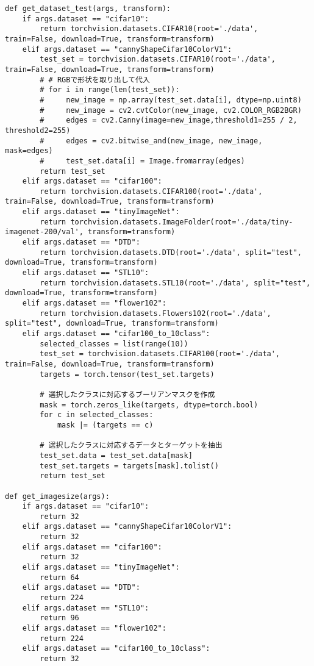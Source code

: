 {\begin{verbatim}
def get_dataset_test(args, transform):
    if args.dataset == "cifar10":
        return torchvision.datasets.CIFAR10(root='./data', train=False, download=True, transform=transform)
    elif args.dataset == "cannyShapeCifar10ColorV1":
        test_set = torchvision.datasets.CIFAR10(root='./data', train=False, download=True, transform=transform)
        # # RGBで形状を取り出して代入
        # for i in range(len(test_set)):
        #     new_image = np.array(test_set.data[i], dtype=np.uint8)
        #     new_image = cv2.cvtColor(new_image, cv2.COLOR_RGB2BGR)
        #     edges = cv2.Canny(image=new_image,threshold1=255 / 2, threshold2=255)
        #     edges = cv2.bitwise_and(new_image, new_image, mask=edges)
        #     test_set.data[i] = Image.fromarray(edges)
        return test_set
    elif args.dataset == "cifar100":
        return torchvision.datasets.CIFAR100(root='./data', train=False, download=True, transform=transform)
    elif args.dataset == "tinyImageNet":
        return torchvision.datasets.ImageFolder(root='./data/tiny-imagenet-200/val', transform=transform)
    elif args.dataset == "DTD":
        return torchvision.datasets.DTD(root='./data', split="test", download=True, transform=transform)
    elif args.dataset == "STL10":
        return torchvision.datasets.STL10(root='./data', split="test", download=True, transform=transform)
    elif args.dataset == "flower102":
        return torchvision.datasets.Flowers102(root='./data', split="test", download=True, transform=transform)
    elif args.dataset == "cifar100_to_10class":
        selected_classes = list(range(10))
        test_set = torchvision.datasets.CIFAR100(root='./data', train=False, download=True, transform=transform)
        targets = torch.tensor(test_set.targets)
    
        # 選択したクラスに対応するブーリアンマスクを作成
        mask = torch.zeros_like(targets, dtype=torch.bool)
        for c in selected_classes:
            mask |= (targets == c)
        
        # 選択したクラスに対応するデータとターゲットを抽出
        test_set.data = test_set.data[mask]
        test_set.targets = targets[mask].tolist()
        return test_set

def get_imagesize(args):
    if args.dataset == "cifar10":
        return 32
    elif args.dataset == "cannyShapeCifar10ColorV1":
        return 32
    elif args.dataset == "cifar100":
        return 32
    elif args.dataset == "tinyImageNet":
        return 64
    elif args.dataset == "DTD":
        return 224
    elif args.dataset == "STL10":
        return 96
    elif args.dataset == "flower102":
        return 224
    elif args.dataset == "cifar100_to_10class":
        return 32


\end{verbatim}}
